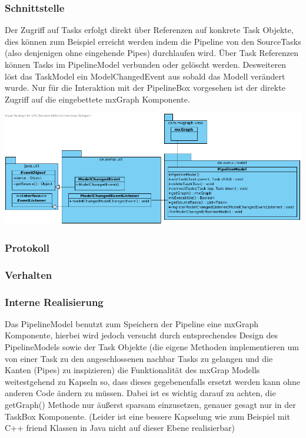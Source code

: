 \documentclass[a4paper,12pt]{scrartcl}
\begin{document}
\subsubsection{Schnittstelle}
Der Zugriff auf Tasks erfolgt direkt über Referenzen auf konkrete Task Objekte, dies können zum Beispiel erreicht werden
indem die Pipeline von den SourceTasks (also denjenigen ohne eingehende Pipes) durchlaufen wird. Über Task Referenzen können Tasks im PipelineModel verbunden oder gelöscht werden. Desweiteren löst das TaskModel ein ModelChangedEvent aus sobald das Modell verändert wurde. Nur für die Interaktion mit der PipelineBox vorgesehen ist der direkte Zugriff auf die eingebettete mxGraph Komponente.
\begin{center}
\includegraphics[width=17cm]{Schnittstelle_PipelineModel.png}
\end{center}
\subsubsection{Protokoll}
\subsubsection{Verhalten}
\subsubsection{Interne Realisierung}
Das PipelineModel benutzt zum Speichern der Pipeline eine mxGraph Komponente, hierbei wird jedoch versucht durch entsprechendes Design des PipelineModels sowie der Task Objekte (die eigene Methoden implementieren um von einer Task zu
den angeschlossenen nachbar Tasks zu gelangen und die Kanten (Pipes) zu inspizieren) die Funktionalität des mxGrap Modells
weitestgehend zu Kapseln so, dass dieses gegebenenfalls ersetzt werden kann ohne anderen Code ändern zu müssen.
Dabei ist es wichtig darauf zu achten, die getGraph() Methode nur äußerst sparsam einzusetzen, genauer gesagt nur in der TaskBox Komponente. (Leider ist eine bessere Kapselung wie zum Beispiel mit C++ friend Klassen in Java nicht auf dieser Ebene realisierbar)
\end{document}
